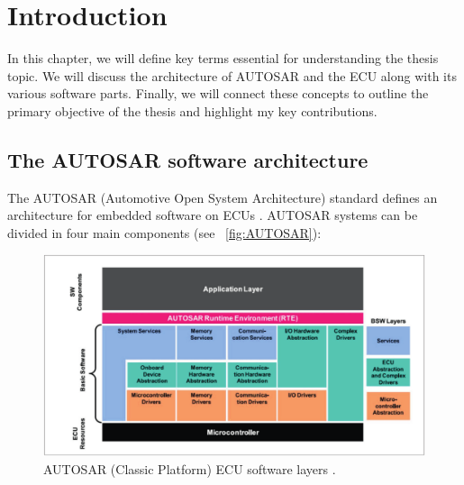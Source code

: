 
\chapter{Introduction}\label{chapter:introduction}
In this chapter, we will define key terms essential for understanding the thesis topic. We will discuss the architecture of AUTOSAR and the ECU along with its various software parts. Finally, we will connect these concepts to outline the primary objective of the thesis and highlight my key contributions.

\section{The AUTOSAR software architecture}
The AUTOSAR (Automotive Open System Architecture) standard defines an architecture for embedded software on ECUs \cite{autosar2022}. AUTOSAR systems can be divided in four main components (see ~\autoref{fig:AUTOSAR}):
\begin{figure}[htpb]
  \centering
  \includegraphics[width=1\textwidth]{figures/AUTOSAR}
  \caption{AUTOSAR (Classic Platform) ECU software layers \cite{smartse2020}.} \label{fig:AUTOSAR}
\end{figure}
